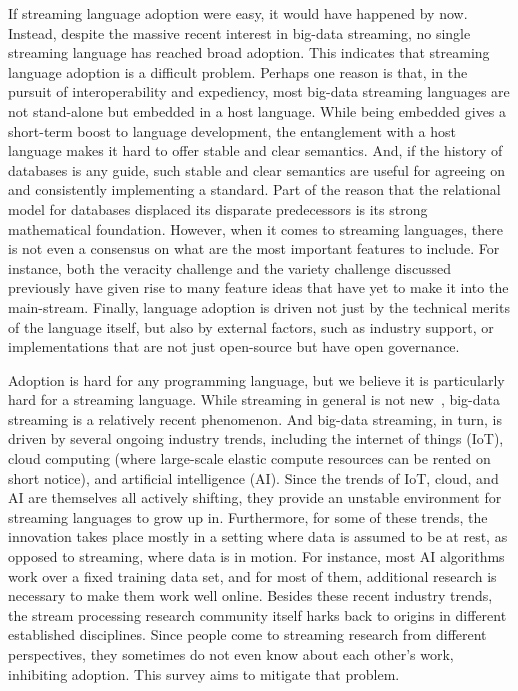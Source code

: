 If streaming language adoption were easy, it would have happened by
now. Instead, despite the massive recent interest in big-data
streaming, no single streaming language has reached broad adoption.
This indicates that streaming language adoption is a difficult
problem. Perhaps one reason is that, in the pursuit of
interoperability and expediency, most big-data streaming languages are
not stand-alone but embedded in a host language. While being embedded
gives a short-term boost to language development, the entanglement
with a host language makes it hard to offer stable and clear
semantics. And, if the history of databases is any guide, such stable
and clear semantics are useful for agreeing on and consistently
implementing a standard. Part of the reason that the relational model
for databases displaced its disparate predecessors is its strong
mathematical foundation. However, when it comes to streaming
languages, there is not even a consensus on what are the most
important features to include. For instance, both the veracity
challenge and the variety challenge discussed previously have given
rise to many feature ideas that have yet to make it into the
main-stream. Finally, language adoption is driven not just by the
technical merits of the language itself, but also by external factors,
such as industry support, or implementations that are not just
open-source but have open governance.

Adoption is hard for any programming language, but we believe it is
particularly hard for a streaming language. While streaming in general
is not new~\cite{stephens_1997}, big-data streaming is a relatively
recent phenomenon. And big-data streaming, in turn, is driven by
several ongoing industry trends, including the internet of things
(IoT), cloud computing (where large-scale elastic compute resources
can be rented on short notice), and artificial intelligence
(AI). Since the trends of IoT, cloud, and AI are themselves all
actively shifting, they provide an unstable environment for streaming
languages to grow up in. Furthermore, for some of these trends, the
innovation takes place mostly in a setting where data is assumed to be
at rest, as opposed to streaming, where data is in motion. For
instance, most AI algorithms work over a fixed training data set, and
for most of them, additional research is necessary to make them work
well online. Besides these recent industry trends, the stream
processing research community itself harks back to origins in
different established disciplines.  Since people come to streaming
research from different perspectives, they sometimes do not even know
about each other's work, inhibiting adoption. This survey aims to
mitigate that problem.
